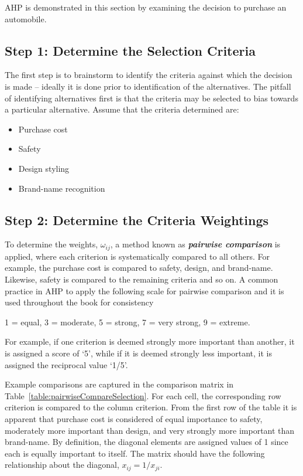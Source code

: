 AHP is demonstrated in this section by examining the decision to
purchase an automobile.

\subsection*{Step 1: Determine the Selection Criteria}

The first step is to brainstorm to identify the criteria against which
the decision is made -- ideally it is done prior to identification of
the alternatives. The pitfall of identifying alternatives first is that
the criteria may be selected to bias towards a particular alternative.
Assume that the criteria determined are:

\begin{itemize}
\item
  Purchase cost
\item
  Safety
\item
  Design styling
\item
  Brand-name recognition
\end{itemize}

\subsection*{Step 2: Determine the Criteria Weightings}

To determine the weights, $\omega_{ij}$,
a method known as \emph{\textbf{pairwise comparison}} is applied, where
each criterion is systematically compared to all others. For example,
the purchase cost is compared to safety, design, and brand-name.
Likewise, safety is compared to the remaining criteria and so on. A
common practice in AHP to apply the following scale for pairwise
comparison and it is used throughout the book for consistency
\begin{center}
1 = equal, 3 = moderate, 5 = strong, 7 = very strong, 9 = extreme.
\end{center}
For example, if one criterion is deemed strongly more important than
another, it is assigned a score of `5', while if it is deemed strongly
less important, it is assigned the reciprocal value `1/5'.

Example comparisons are captured in the comparison matrix in 
Table~\ref{table:pairwiseCompareSelection}.
For each cell, the corresponding row criterion is compared to the column
criterion. From the first row of the table it is apparent that purchase
cost is considered of equal importance to safety, moderately more
important than design, and very strongly more important than brand-name.
By definition, the diagonal elements are assigned values of 1 since each
is equally important to itself. The matrix should have the following
relationship about the diagonal, $x_{ij} = 1/x_{ji}$.


